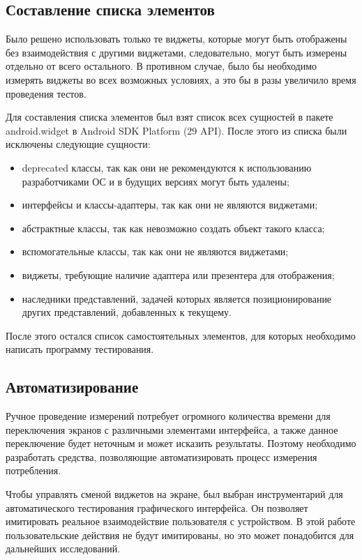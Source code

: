 \documentclass[a4paper,14pt]{extarticle} %
\begin{document}
	\subsection{Составление списка элементов}
	
	Было решено использовать только те виджеты, которые могут быть отображены без взаимодействия с другими виджетами, следовательно, могут быть измерены отдельно от всего остального. В противном случае, было бы необходимо измерять виджеты во всех возможных условиях, а это бы в разы увеличило время проведения тестов.
	
	Для составления списка элементов был взят список всех сущностей в пакете android.widget в Android SDK Platform (29 API). После этого из списка были исключены следующие сущности:
	\begin{itemize}
		\item deprecated классы, так как они не рекомендуются к использованию разработчиками ОС и в будущих версиях могут быть удалены;
		\item интерфейсы и классы-адаптеры, так как они не являются виджетами;
		\item абстрактные классы, так как невозможно создать объект такого класса;
		\item вспомогательные классы, так как они не являются виджетами;
		\item виджеты, требующие наличие адаптера или презентера для отображения;
		\item наследники представлений, задачей которых является позиционирование других представлений, добавленных к текущему.
	\end{itemize}
	
	После этого остался список самостоятельных элементов, для которых необходимо написать программу тестирования.
	
	\subsection{Автоматизирование}
	
	Ручное проведение измерений потребует огромного количества времени для переключения экранов с различными элементами интерфейса, а также данное переключение будет неточным и может исказить результаты. Поэтому необходимо разработать средства, позволяющие автоматизировать процесс измерения потребления.
	
	Чтобы управлять сменой виджетов на экране, был выбран инструментарий для автоматического тестирования графического интерфейса. Он позволяет имитировать реальное взаимодействие пользователя с устройством. В этой работе пользовательские действия не будут имитированы, но это может понадобится для дальнейших исследований.
	
\end{document}
